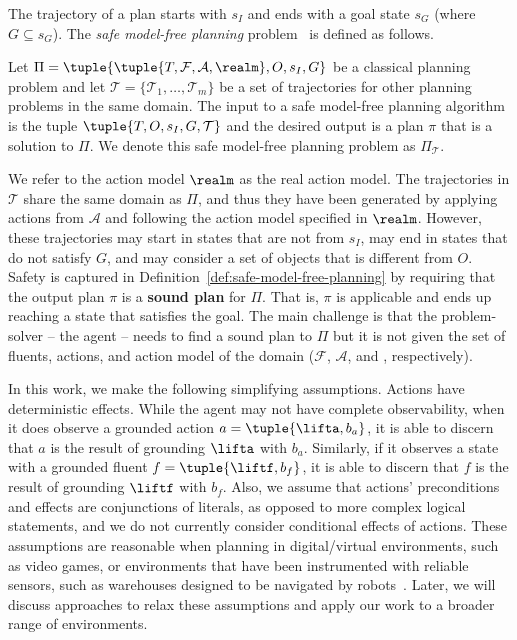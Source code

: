 


The trajectory of a plan starts with $s_I$ and ends with a goal state $s_G$ (where $G\subseteq s_G$). 
The \emph{safe model-free planning} problem~\cite{stern2017efficientAndSafe} is defined as follows. 
\begin{definition}
Let $\Pi=\tuple{\tuple{T, \mathcal{F}, \mathcal{A}, \realm}, O, s_I, G}$ be a classical planning problem and let $\mathcal{T}=\{\mathcal{T}_1,\ldots, \mathcal{T}_m\}$ be a set of trajectories %
for other planning problems in the same domain. 
The input to a safe model-free planning algorithm is the tuple $\tuple{T,O, s_I, G, \mathcal{T}}$ and the desired output is a plan $\pi$ that is a solution to $\Pi$. We denote this safe model-free planning problem as $\Pi_{\mathcal{T}}$. 
\label{def:safe-model-free-planning}
\end{definition}
We refer to the action model $\realm$ as the real action model. 
The trajectories in $\mathcal{T}$ share the same domain as $\Pi$, 
and thus they have been generated by applying actions from $\mathcal{A}$ 
and following the action model specified in $\realm$. 
However, these trajectories may start in states that are not from $s_I$, 
may end in states that do not satisfy $G$, 
and may consider a set of objects that is different from $O$.  
Safety is captured in Definition~\ref{def:safe-model-free-planning} by requiring that the output plan $\pi$ is a \textbf{sound plan} for $\Pi$. That is, $\pi$ is applicable and ends up reaching a state that satisfies the goal.  
The main challenge is that the problem-solver -- the agent -- needs to find a sound plan to $\Pi$ but it is not given the set of fluents, actions, and action model of the domain ($\mathcal{F}$, $\mathcal{A}$, and \realm, respectively). 


In this work, we make the following simplifying assumptions. 
Actions have deterministic effects. 
While the agent may not have complete observability, when it does observe a grounded action $a=\tuple{\lifta, b_a}$, it is able to discern that $a$ is the result of grounding $\lifta$ with $b_a$. 
Similarly, if it observes a state with a grounded fluent $f=\tuple{\liftf, b_f}$, it is able to discern that $f$ is the result of grounding $\liftf$ with $b_f$. Also, we assume that actions' preconditions and effects are conjunctions of literals, as opposed to more complex logical statements, and we do not currently consider conditional effects of actions. 
These assumptions are reasonable when planning in digital/virtual environments, such as video games, or environments that have been instrumented with reliable sensors, such as warehouses designed to be navigated by robots~\cite{li2020lifelong}. 
Later, we will discuss approaches to relax these assumptions and apply our work to a broader range of environments. 

